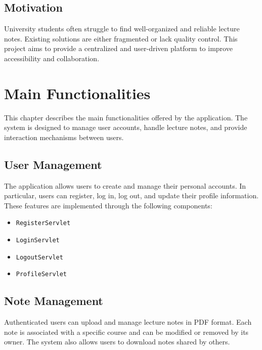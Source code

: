\documentclass[12pt, a4paper]{article}
\begin{document}
    \subsection{Motivation}

    University students often struggle to find well-organized and reliable lecture notes.
    Existing solutions are either fragmented or lack quality control. This project aims to
    provide a centralized and user-driven platform to improve accessibility and collaboration.

    \newpage
    \section{Main Functionalities}

    This chapter describes the main functionalities offered by the application.
    The system is designed to manage user accounts, handle lecture notes, and
    provide interaction mechanisms between users.

    \subsection{User Management}

    The application allows users to create and manage their personal accounts.
    In particular, users can register, log in, log out, and update their profile
    information. These features are implemented through the following components:

    \begin{itemize}
        \item \texttt{RegisterServlet}
        \item \texttt{LoginServlet}
        \item \texttt{LogoutServlet}
        \item \texttt{ProfileServlet}
    \end{itemize}

    \subsection{Note Management}

    Authenticated users can upload and manage lecture notes in PDF format.
    Each note is associated with a specific course and can be modified or removed
    by its owner. The system also allows users to download notes shared by others.
\end{document}
